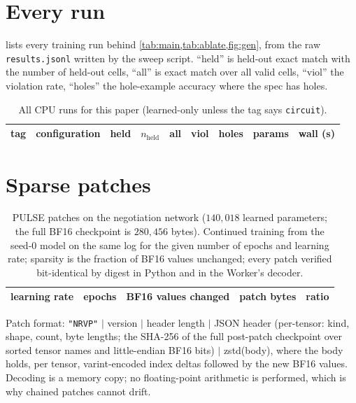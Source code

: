 \section{Every run}
\label{app:runs}

 lists every training run behind \cref{tab:main,tab:ablate,fig:gen}, from the raw \texttt{results.jsonl} written by the sweep script. ``held'' is held-out exact match with the number of held-out cells, ``all'' is exact match over all valid cells, ``viol'' the violation rate, ``holes'' the hole-example accuracy where the spec has holes.

\begin{table}[h]
\centering
\caption{All CPU runs for this paper (learned-only unless the tag says \texttt{circuit}).}
\label{tab:allruns}
\scriptsize
\begin{tabular}{llrrrrrrr}
\toprule
tag & configuration & held & $n_{\text{held}}$ & all & viol & holes & params & wall (s)\\
\midrule

\end{tabular}
\end{table}

\section{Sparse patches}
\label{app:pulse}

\begin{table}[h]
\centering
\caption{PULSE patches on the negotiation network ($140{,}018$ learned parameters; the full BF16 checkpoint is $280{,}456$ bytes). Continued training from the seed-0 model on the same log for the given number of epochs and learning rate; sparsity is the fraction of BF16 values unchanged; every patch verified bit-identical by digest in Python and in the Worker's decoder.}
\label{tab:pulse}
\small
\begin{tabular}{rrrrr}
\toprule
learning rate & epochs & BF16 values changed & patch bytes & ratio\\
\midrule

\end{tabular}
\end{table}

Patch format: \texttt{"NRVP"} $\mid$ version $\mid$ header length $\mid$ JSON header (per-tensor: kind, shape, count, byte lengths; the SHA-256 of the full post-patch checkpoint over sorted tensor names and little-endian BF16 bits) $\mid$ zstd(body), where the body holds, per tensor, varint-encoded index deltas followed by the new BF16 values. Decoding is a memory copy; no floating-point arithmetic is performed, which is why chained patches cannot drift.

